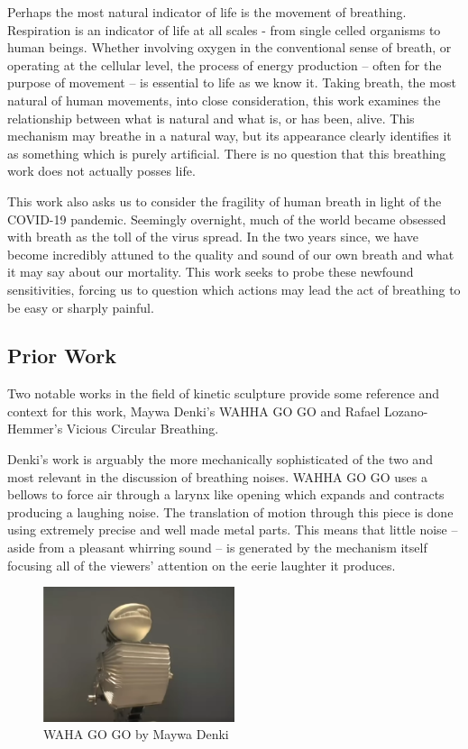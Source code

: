 \documentclass[letterpaper]{article}
\begin{document}
Perhaps the most natural indicator of life is the movement of breathing. Respiration is an indicator of life at all scales - from single celled organisms to human beings. Whether involving oxygen in the conventional sense of breath, or operating at the cellular level, the process of energy production -- often for the purpose of movement -- is essential to life as we know it.\cite{zimmer} Taking breath, the most natural of human movements, into close consideration, this work examines the relationship between what is natural and what is, or has been, alive. This mechanism may breathe in a natural way, but its appearance clearly identifies it as something which is purely artificial. There is no question that this breathing work does not actually posses life.   

This work also asks us to consider the fragility of human breath in light of the COVID-19 pandemic. Seemingly overnight, much of the world became obsessed with breath as the toll of the virus spread. In the two years since, we have become incredibly attuned to the quality and sound of our own breath and what it may say about our mortality. This work seeks to probe these newfound sensitivities, forcing us to question which actions may lead the act of breathing to be easy or sharply painful. 

\subsection{Prior Work}
Two notable works in the field of kinetic sculpture provide some reference and context for this work, Maywa Denki's WAHHA GO GO and Rafael Lozano-Hemmer's Vicious Circular Breathing.\cite{denki}\cite{lozanohemmer} 

Denki's work is arguably the more mechanically sophisticated of the two and most relevant in the discussion of breathing noises. WAHHA GO GO uses a bellows to force air through a larynx like opening which expands and contracts producing a laughing noise. The translation of motion through this piece is done using extremely precise and well made metal parts. This means that little noise -- aside from a pleasant whirring sound -- is generated by the mechanism itself focusing all of the viewers' attention on the eerie laughter it produces.

\begin{figure}[h]
\includegraphics[width=0.5\textwidth]{images/whagogo.png}
\caption{WAHA GO GO by Maywa Denki}
\label{fig:denki}
\end{figure}
\end{document}
